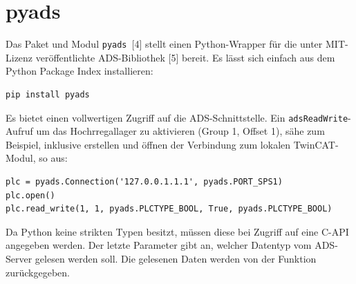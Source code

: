 \documentclass{fh-ium-bama}
\newcommand{\pyads}{\lstinline|pyads|}
\begin{document}
\section{pyads}
Das Paket und Modul \pyads\ [4] stellt einen Python-Wrapper für die unter MIT-Lizenz veröffentlichte ADS-Bibliothek [5] bereit. Es lässt sich einfach aus dem Python Package Index installieren:
\begin{lstlisting}
pip install pyads
\end{lstlisting}
Es bietet einen vollwertigen Zugriff auf die ADS-Schnittstelle. Ein \lstinline|adsReadWrite|-Aufruf um das Hochrregallager zu aktivieren (Group 1, Offset 1), sähe zum Beispiel, inklusive erstellen und öffnen der Verbindung zum lokalen TwinCAT-Modul, so aus:
\begin{lstlisting}
plc = pyads.Connection('127.0.0.1.1.1', pyads.PORT_SPS1)
plc.open()
plc.read_write(1, 1, pyads.PLCTYPE_BOOL, True, pyads.PLCTYPE_BOOL)
\end{lstlisting}

Da Python keine strikten Typen besitzt, müssen diese bei Zugriff auf eine C-API angegeben werden. Der letzte Parameter gibt an, welcher Datentyp vom ADS-Server gelesen werden soll. Die gelesenen Daten werden von der Funktion zurückgegeben.

\newpage
\end{document}
